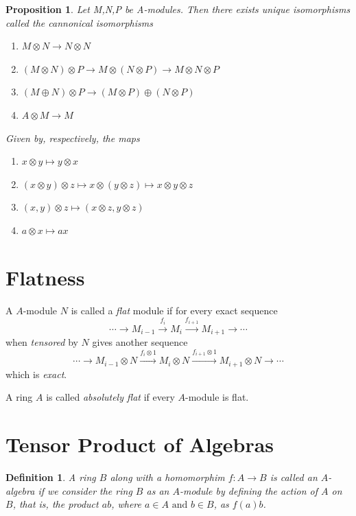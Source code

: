 \documentclass[]{report}
\newtheorem{prop}[theorem]{Proposition}
\newtheorem{defn}[theorem]{Definition}
\begin{document}
\begin{prop} 
    Let M,N,P be A-modules. Then there exists unique isomorphisms called the cannonical isomorphisms 
    \begin{enumerate}
        \item $M\otimes N \rightarrow N\otimes N$  
        \item $(M\otimes N) \otimes P \rightarrow M\otimes (N\otimes P) \rightarrow M\otimes N\otimes P$
        \item $(M\oplus N) \otimes P \rightarrow (M\otimes P) \oplus (N\otimes P)$
        \item $A\otimes M \rightarrow M$
    \end{enumerate}
    Given by, respectively, the maps
    \begin{enumerate}
        \item $x\otimes y \mapsto y\otimes x$
        \item $(x\otimes y) \otimes z \mapsto x \otimes (y\otimes z) \mapsto x\otimes y \otimes z$
        \item $(x,y)\otimes z \mapsto (x\otimes z, y\otimes z)$
        \item $a\otimes x \mapsto ax$

    \end{enumerate}
    \cite{atiyah1}
\end{prop}
    
\section{Flatness}

A $A$-module $N$ is called a \textit{flat} module if for every exact sequence
$$\cdots \rightarrow M_{i-1} \xrightarrow{f_i} M_i \xrightarrow{f_{i+1}} M_{i+1} \rightarrow \cdots$$ 
when \textit{tensored} by $N$ gives another sequence
$$\cdots \rightarrow M_{i-1}\otimes N \xrightarrow{f_i \otimes 1} M_i\otimes N \xrightarrow{f_{i+1} \otimes 1} M_{i+1}\otimes N \rightarrow \cdots$$ 
which is \textit{exact}.

A ring $A$ is called \textit{absolutely flat} if every $A$-module is flat. 

\section{Tensor Product of Algebras}

\begin{defn}
    A ring $B$ along with a homomorphim $f: A \rightarrow B$ is called an $A$-algebra if we consider the ring $B$ as an $A$-module by defining the action of $A$ on $B$, that is, the product $ab$, where $a \in A \text{ and } b \in B$, as $f(a)b$.
\end{defn}
\end{document}

